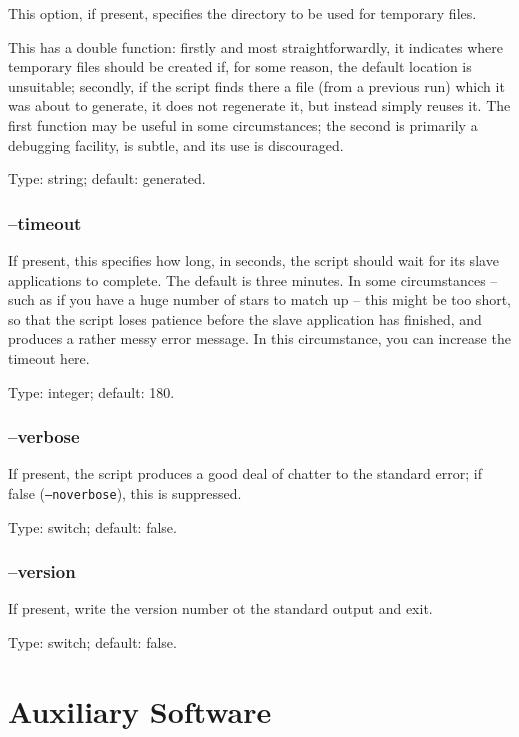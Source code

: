 \documentclass[twoside,11pt]{article}
\newcommand{\xlabel}[1]{}
\begin{document}
This option, if present, specifies the directory to be used for temporary
files.

This has a double function: firstly and most straightforwardly, it indicates
where temporary files should be created if, for some reason, the default
location is unsuitable; secondly, if the script finds there a file (from a
previous run) which it was about to generate, it does not regenerate it, but
instead simply reuses it.  The first function may be useful in some
circumstances; the second is primarily a debugging facility, is subtle, and
its use is discouraged.

Type: string; default: generated.

\subsubsection{\xlabel{sb_options_timeout}--timeout\label{sb:options:timeout}}

If present, this specifies how long, in seconds, the script should wait for
its slave applications to complete.  The default is three minutes.  In some
circumstances -- such as if you have a huge number of stars to match up --
this might be too short, so that the script loses patience before the slave
application has finished, and produces a rather messy error message.  In this
circumstance, you can increase the timeout here.

Type: integer; default: 180.

\subsubsection{\xlabel{sb_options_verbose}--verbose\label{sb:options:verbose}}

If present, the script produces a good deal of chatter to the standard error;
if false (\texttt{--noverbose}), this is suppressed.

Type: switch; default: false.

\subsubsection{\xlabel{sb_options_version}--version\label{sb:options:version}}

If present, write the version number ot the standard output and exit.

Type: switch; default: false.

\section{\xlabel{se_auxiliary}Auxiliary Software\label{se:auxiliary}}
\end{document}
